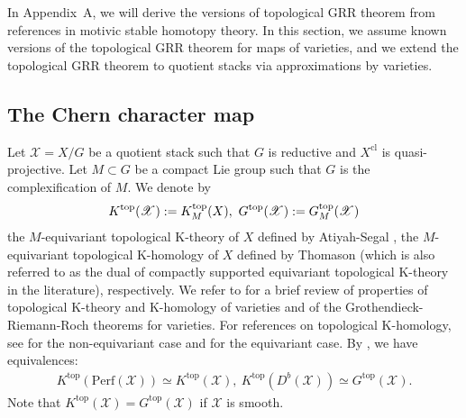 \documentclass [11pt,oneside,a4paper,mathscr]{amsart}
\theoremstyle{definition}
\newcommand{\X}{\mathscr{X}}
\begin{document}
In Appendix~A, we will derive the versions of topological GRR theorem from 
references in motivic stable homotopy theory. In this section, we assume known versions of the topological GRR theorem for maps of varieties, and we 
extend the topological GRR theorem to quotient stacks via approximations by varieties. 


\subsection{The Chern character map}\label{subsec:chernmap}

Let $\X=X/G$ be a quotient stack such that $G$ is reductive and $X^{\mathrm{cl}}$ is quasi-projective. Let $M\subset G$ be a compact Lie group such that $G$ is the complexification of $M$.
We denote by \begin{align*}
 K^{\mathrm{top}}(\X):=K^{\mathrm{top}}_{M}(X), \ 
 G^{\rm{top}}(\X):=G^{\rm{top}}_{M}(\X)
 \end{align*}
 the $M$-equivariant topological K-theory of $X$ defined by Atiyah-Segal \cite{Segal}, 
 the $M$-equivariant topological K-homology of $X$ defined by Thomason \cite{ThomasonAS} (which is also referred to as the dual of compactly supported equivariant topological K-theory in the literature), respectively.  
We refer to \cite{BF02392091} for a brief review of properties of topological K-theory and K-homology of varieties and of the Grothendieck-Riemann-Roch theorems for varieties. 
For references on topological K-homology, see \cite{MR0679698} for the non-equivariant case and \cite[Subsection 2.1.2]{HLP} for the equivariant case.
By \cite[Theorem C and the remark following it]{HLP}, we have equivalences:
\begin{align}\label{HLPSiso}
    K^{\mathrm{top}}(\mathrm{Perf}(\X))\simeq K^{\mathrm{top}}(\X),\
   K^{\mathrm{top}}(D^b(\X))\simeq G^{\mathrm{top}}(\X).
\end{align}
Note that $K^{\mathrm{top}}(\X)=G^{\mathrm{top}}(\X)$ if $\X$ is smooth.
\end{document}
